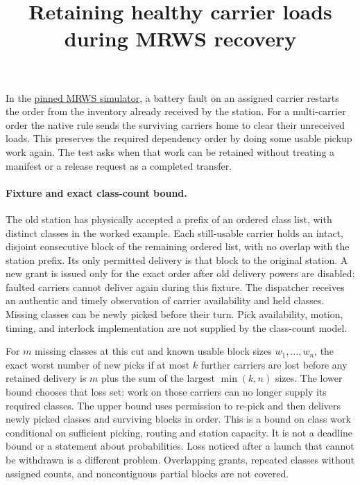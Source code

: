 \documentclass{article}
\title{Retaining healthy carrier loads during MRWS recovery}
\date{}
\begin{document}
\maketitle
In the
\href{https://github.com/automaticdai/MRWS_MultiRobot_Warehouse_Scheduling/tree/941338e9ea4c4eaebb87f8374f80fd576497ad01}{pinned MRWS simulator},
a battery fault on an assigned carrier restarts the order from the
inventory already received by the station. For a multi-carrier order
the native rule sends the surviving carriers home to clear their
unreceived loads. This preserves the required dependency order by doing
some usable pickup work again. The test asks when that work can be
retained without treating a manifest or a release request as a
completed transfer.

\paragraph{Fixture and exact class-count bound.}
The old station has physically accepted a prefix of an ordered
class list, with distinct classes in the worked example. Each
still-usable carrier holds an intact, disjoint consecutive block
of the remaining ordered list, with no overlap with the station
prefix. Its only permitted delivery is that block to the original
station. A new grant is issued only for the exact order after old
delivery powers are disabled; faulted carriers cannot deliver
again during this fixture. The dispatcher receives an authentic
and timely observation of carrier availability and held classes.
Missing classes can be newly picked before their turn. Pick
availability, motion, timing, and interlock implementation are
not supplied by the class-count model.

For $m$ missing classes at this cut and known usable block sizes
$w_1,\ldots,w_n$, the exact worst number of new picks if at most
$k$ further carriers are lost before any retained delivery is
$m$ plus the sum of the largest $\min(k,n)$ sizes. The lower bound
chooses that loss set: work on those carriers can no longer
supply its required classes. The upper bound uses permission to
re-pick and then delivers newly picked classes and surviving
blocks in order. This is a bound on class work conditional on
sufficient picking, routing and station capacity. It is not a
deadline bound or a statement about probabilities. Loss noticed
after a launch that cannot be withdrawn is a different problem.
Overlapping grants, repeated classes without assigned counts,
and noncontiguous partial blocks are not covered.
\end{document}
